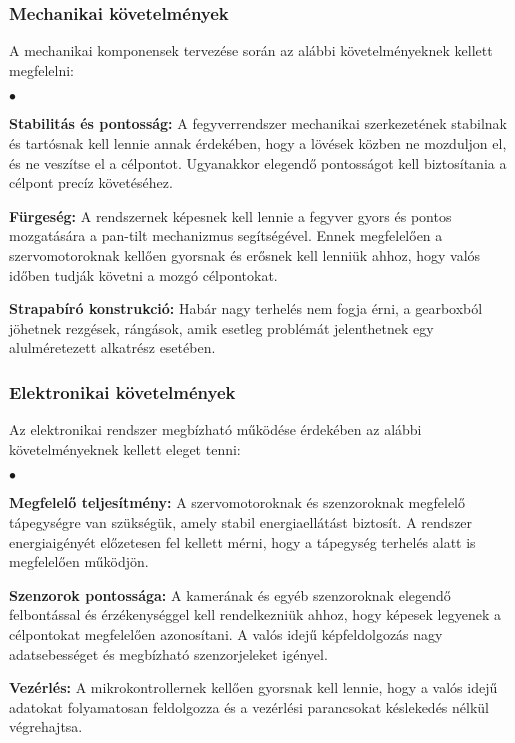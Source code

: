 \subsubsection*{Mechanikai követelmények} 

A mechanikai komponensek tervezése során az alábbi követelményeknek kellett megfelelni:
\begin{list}{$\bullet$}{}
	\item \textbf{Stabilitás és pontosság:}  A fegyverrendszer mechanikai szerkezetének stabilnak és tartósnak kell lennie annak érdekében, hogy a lövések közben ne mozduljon el, és ne veszítse el a célpontot. Ugyanakkor elegendő pontosságot kell biztosítania a célpont precíz követéséhez.
	\item \textbf{Fürgeség:} A rendszernek képesnek kell lennie a fegyver gyors és pontos mozgatására a pan-tilt mechanizmus segítségével. Ennek megfelelően a szervomotoroknak kellően gyorsnak és erősnek kell lenniük ahhoz, hogy valós időben tudják követni a mozgó célpontokat.
	\item \textbf{Strapabíró konstrukció:} Habár nagy terhelés nem fogja érni, a gearboxból jöhetnek rezgések, rángások, amik esetleg problémát jelenthetnek egy alulméretezett alkatrész esetében.
\end{list}

\subsubsection*{Elektronikai követelmények}

Az elektronikai rendszer megbízható működése érdekében az alábbi követelményeknek kellett eleget tenni:

\begin{list}{$\bullet$}{}
	\item \textbf{Megfelelő teljesítmény:}  A szervomotoroknak és szenzoroknak megfelelő tápegységre van szükségük, amely stabil energiaellátást biztosít. A rendszer energiaigényét előzetesen fel kellett mérni, hogy a tápegység terhelés alatt is megfelelően működjön.
	\item \textbf{Szenzorok pontossága:} A kamerának és egyéb szenzoroknak elegendő felbontással és érzékenységgel kell rendelkezniük ahhoz, hogy képesek legyenek a célpontokat megfelelően azonosítani. A valós idejű képfeldolgozás nagy adatsebességet és megbízható szenzorjeleket igényel.
	\item \textbf{Vezérlés:} A mikrokontrollernek kellően gyorsnak kell lennie, hogy a valós idejű adatokat folyamatosan feldolgozza és a vezérlési parancsokat késlekedés nélkül végrehajtsa.
\end{list}
\pagebreak

